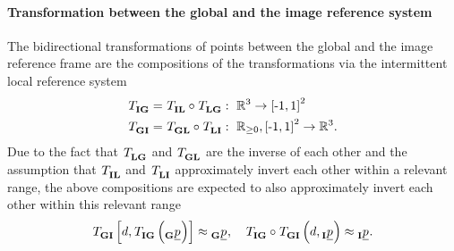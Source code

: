 \paragraph*{Transformation between the global and the image reference system} $\ $\\
The bidirectional transformations of points between the global and the image reference frame
are the compositions of the transformations via the intermittent local reference system
\begin{align} \label{eq:global_image_transformations}
    \trafo[]{}{\irs\grs}{}{}
    &=
    \trafo[]{}{\irs\lrs}{}{} \circ \trafo[]{}{\lrs\grs}{}{}
    :\ 
    \mathbb{R}^3 \rightarrow \left[\text{-} 1, 1\right]^2 
    \nonumber \\
    \trafo[]{}{\grs\irs}{}{}
    &=
    \trafo[]{}{\grs\lrs}{}{} \circ \trafo[]{}{\lrs\irs}{}{}
    :\ 
    \mathbb{R}_{\ge 0}, \left[\text{-} 1, 1\right]^2 \rightarrow \mathbb{R}^3.
\end{align}
Due to the fact that
$\trafo[]{}{\lrs\grs}{}{}$
and
$\trafo[]{}{\grs\lrs}{}{}$
are the inverse of each other
and the assumption that
$\trafo[]{}{\irs\lrs}{}{}$
and
$\trafo[]{}{\lrs\irs}{}{}$
approximately invert each other within a relevant range,
the above compositions are expected to also approximately invert each other within this relevant range
\begin{equation}
    \trafo[]{}{\grs\irs}{}{} \left[
        d, \trafo[]{}{\irs\grs}{}{} \left( \pos[]{}{}{\grs}{} \right)
    \right]
    \approx
    \pos[]{}{}{\grs}{}
    ,\quad
    \trafo[]{}{\irs\grs}{}{}
    \circ 
    \trafo[]{}{\grs\irs}{}{} \left(
        d, \pos[]{}{}{\irs}{}
    \right)
    \approx
    \pos[]{}{}{\irs}{}.
\end{equation}

